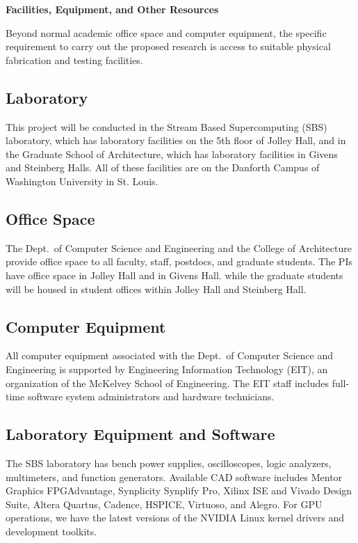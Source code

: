 \documentclass[11pt]{article}
\begin{document}
\pagestyle{empty}
\thispagestyle{empty}

\begin{center}
\textbf{\Large Facilities, Equipment, and Other Resources}
\end{center}

\noindent
Beyond normal academic office space and computer equipment, the 
specific requirement to carry out the proposed research is access to
suitable physical fabrication and testing facilities.

\subsection*{Laboratory}

This project will be conducted in the Stream Based Supercomputing
(SBS) laboratory, which has laboratory
facilities on the 5th floor of Jolley Hall,
and in the Graduate School of Architecture, which has laboratory
facilities in Givens and Steinberg Halls.
All of these facilities are on the Danforth
Campus of Washington University in St. Louis.

\subsection*{Office Space}

The Dept.\ of Computer Science and Engineering and the College of
Architecture provide office space to
all faculty, staff, postdocs, and graduate students.  The PIs have office
space in Jolley Hall and in Givens Hall.
while the graduate students will be housed in student offices
within Jolley Hall and Steinberg Hall.

\subsection*{Computer Equipment}

All computer equipment associated with the Dept.\ of Computer Science
and Engineering is supported by Engineering Information Technology
(EIT), an organization of the McKelvey School of Engineering.
The EIT staff includes full-time software system
administrators and hardware technicians.

\subsection*{Laboratory Equipment and Software}

The SBS laboratory has bench power supplies, oscilloscopes, logic
analyzers, multimeters, and function generators.  Available CAD
software includes Mentor Graphics FPGAdvantage, Synplicity Synplify
Pro, Xilinx ISE and Vivado Design Suite, Altera Quartus, Cadence,
HSPICE, Virtuoso, and Alegro.  For GPU operations, we have the latest
versions of the NVIDIA Linux kernel drivers and development toolkits.
\end{document}
